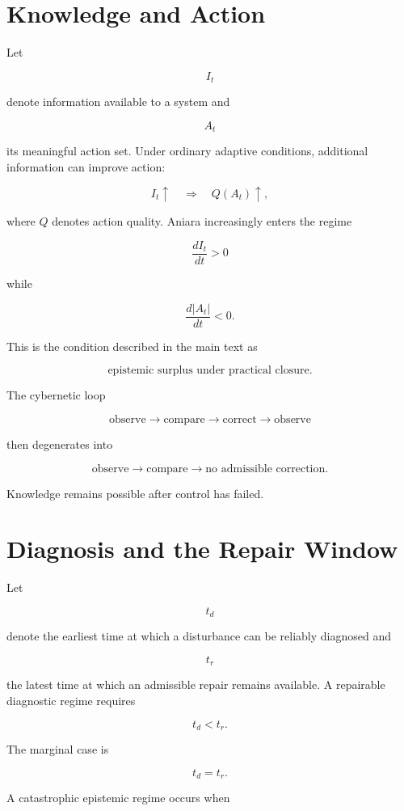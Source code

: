 \documentclass[11pt,oneside]{book}
\theoremstyle{definition}
\theoremstyle{remark}
\begin{document}
\section{Knowledge and Action}

Let

\[
I_t
\]

denote information available to a system and

\[
A_t
\]

its meaningful action set. Under ordinary adaptive conditions, additional information can improve
action:

\[
I_t\uparrow \quad\Rightarrow\quad Q(A_t)\uparrow,
\]

where \(Q\) denotes action quality. Aniara increasingly enters the regime

\[
\frac{dI_t}{dt}>0
\]

while

\[
\frac{d|A_t|}{dt}<0.
\]

This is the condition described in the main text as

\[
\boxed{ \text{epistemic surplus under practical closure}. }
\]

The cybernetic loop

\[
\text{observe} \rightarrow \text{compare} \rightarrow \text{correct} \rightarrow \text{observe}
\]

then degenerates into

\[
\text{observe} \rightarrow \text{compare} \rightarrow \text{no admissible correction}.
\]

Knowledge remains possible after control has failed.

\section{Diagnosis and the Repair Window}

Let

\[
t_d
\]

denote the earliest time at which a disturbance can be reliably diagnosed and

\[
t_r
\]

the latest time at which an admissible repair remains available. A repairable diagnostic regime
requires

\[
t_d<t_r.
\]

The marginal case is

\[
t_d=t_r.
\]

A catastrophic epistemic regime occurs when
\end{document}
